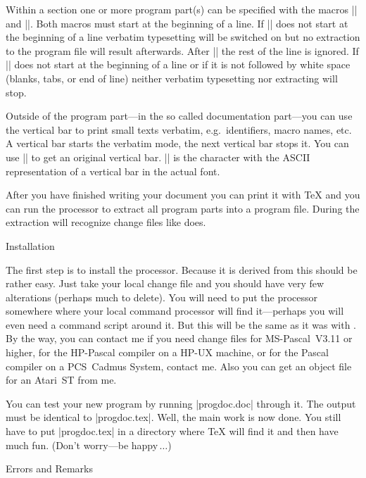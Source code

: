 Within a section one or more program part(s) can be specified with the
macros |\beginprog| and |\endprog|.  Both macros must start at the
beginning of a line.  If |\beginprog| does not start at the beginning
of a line verbatim typesetting will be switched on but no extraction
to the program file will result afterwards.  After |\beginprog| the
rest of the line is ignored.  If |\endprog| does not start at the
beginning of a line or if it is not followed by white space (blanks,
tabs, or end of line) neither verbatim typesetting nor extracting will
stop.

Outside of the program part---in the so called documentation
part---you can use the vertical bar to print small texts verbatim,
e.g.\ identifiers, macro names, etc.  A vertical bar starts the
verbatim mode, the next vertical bar stops it.  You can use
|\origvert| to get an original vertical bar.  |\vbar| is the character
with the {\mc ASCII} representation of a vertical bar in the actual
font.

After you have finished writing your document you can print it with
\TeX{} and you can run the \MAKEPROG{} processor to extract all
program parts into a program file.  During the extraction \MAKEPROG{}
will recognize change files like \TANGLE{} does.




\beginsection Installation

The first step is to install the \MAKEPROG{} processor.  Because it is
derived from \TANGLE{} this should be rather easy.  Just take your
local \TANGLE{} change file and you should have very few alterations
(perhaps much to delete).  You will need to put the \MAKEPROG{}
processor somewhere where your local command processor will find
it---perhaps you will even need a command script around it.  But this
will be the same as it was with \TANGLE{}.  By the way, you can
contact me if you need change files for MS-Pascal~V3.11 or higher, for
the HP-Pascal compiler on a HP-UX machine, or for the Pascal compiler
on a PCS~Cadmus System, contact me.  Also you can get an object file
for an Atari~ST from me.

You can test your new program by running |progdoc.doc| through it.
The output must be identical to |progdoc.tex|.  Well, the main work is
now done.  You still have to put |progdoc.tex| in a directory where
\TeX{} will find it and then have much fun.  (Don't worry---be
happy$\,\ldots$)




\beginsection Errors and Remarks

